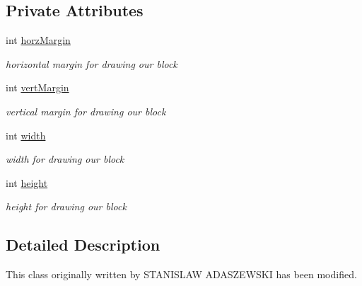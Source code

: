 \subsection*{Private Attributes}
\begin{DoxyCompactItemize}
\item 
\hypertarget{class_q_n_e_block_abc0e0661e1df45f11da586e49e9b0d1e}{int \hyperlink{class_q_n_e_block_abc0e0661e1df45f11da586e49e9b0d1e}{horz\-Margin}}\label{class_q_n_e_block_abc0e0661e1df45f11da586e49e9b0d1e}

\begin{DoxyCompactList}\small\item\em horizontal margin for drawing our block \end{DoxyCompactList}\item 
\hypertarget{class_q_n_e_block_af27a41bfcedcea8989ac8c966a3c1f2e}{int \hyperlink{class_q_n_e_block_af27a41bfcedcea8989ac8c966a3c1f2e}{vert\-Margin}}\label{class_q_n_e_block_af27a41bfcedcea8989ac8c966a3c1f2e}

\begin{DoxyCompactList}\small\item\em vertical margin for drawing our block \end{DoxyCompactList}\item 
\hypertarget{class_q_n_e_block_a856cbc062f9eaf82aff9a3cc9bdb8b0d}{int \hyperlink{class_q_n_e_block_a856cbc062f9eaf82aff9a3cc9bdb8b0d}{width}}\label{class_q_n_e_block_a856cbc062f9eaf82aff9a3cc9bdb8b0d}

\begin{DoxyCompactList}\small\item\em width for drawing our block \end{DoxyCompactList}\item 
\hypertarget{class_q_n_e_block_abaf5eb58d2106da25129e14da4ab7825}{int \hyperlink{class_q_n_e_block_abaf5eb58d2106da25129e14da4ab7825}{height}}\label{class_q_n_e_block_abaf5eb58d2106da25129e14da4ab7825}

\begin{DoxyCompactList}\small\item\em height for drawing our block \end{DoxyCompactList}\end{DoxyCompactItemize}


\subsection{Detailed Description}
This class originally written by S\-T\-A\-N\-I\-S\-L\-A\-W A\-D\-A\-S\-Z\-E\-W\-S\-K\-I has been modified. 


